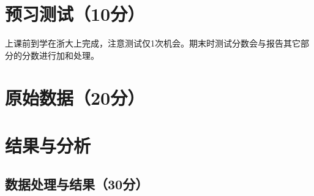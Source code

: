 \documentclass{../template/Report}%
\begin{document}
\maketitle%
\section{预习测试（10分）}
上课前到学在浙大上完成，注意测试仅1次机会。期末时测试分数会与报告其它部分的分数进行加和处理。
\section{原始数据（20分）}
\section{结果与分析}
\subsection{数据处理与结果（30分）}
\end{document}
